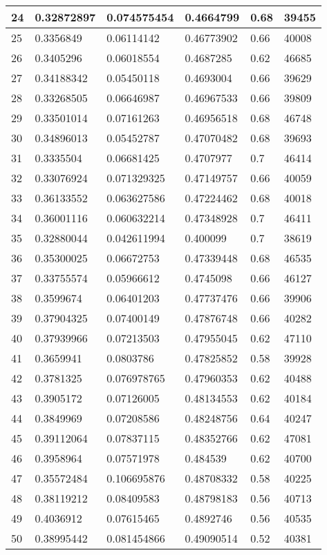 \begin{longtable}{|l|l|l|l|l|l|}
24 & 0.32872897 & 0.074575454 & 0.4664799 & 0.68 & 39455 \\ \hline 
25 & 0.3356849 & 0.06114142 & 0.46773902 & 0.66 & 40008 \\ \hline 
26 & 0.3405296 & 0.06018554 & 0.4687285 & 0.62 & 46685 \\ \hline 
27 & 0.34188342 & 0.05450118 & 0.4693004 & 0.66 & 39629 \\ \hline 
28 & 0.33268505 & 0.06646987 & 0.46967533 & 0.66 & 39809 \\ \hline 
29 & 0.33501014 & 0.07161263 & 0.46956518 & 0.68 & 46748 \\ \hline 
30 & 0.34896013 & 0.05452787 & 0.47070482 & 0.68 & 39693 \\ \hline 
31 & 0.3335504 & 0.06681425 & 0.4707977 & 0.7 & 46414 \\ \hline 
32 & 0.33076924 & 0.071329325 & 0.47149757 & 0.66 & 40059 \\ \hline 
33 & 0.36133552 & 0.063627586 & 0.47224462 & 0.68 & 40018 \\ \hline 
34 & 0.36001116 & 0.060632214 & 0.47348928 & 0.7 & 46411 \\ \hline 
35 & 0.32880044 & 0.042611994 & 0.400099 & 0.7 & 38619 \\ \hline 
36 & 0.35300025 & 0.06672753 & 0.47339448 & 0.68 & 46535 \\ \hline 
37 & 0.33755574 & 0.05966612 & 0.4745098 & 0.66 & 46127 \\ \hline 
38 & 0.3599674 & 0.06401203 & 0.47737476 & 0.66 & 39906 \\ \hline 
39 & 0.37904325 & 0.07400149 & 0.47876748 & 0.66 & 40282 \\ \hline 
40 & 0.37939966 & 0.07213503 & 0.47955045 & 0.62 & 47110 \\ \hline 
41 & 0.3659941 & 0.0803786 & 0.47825852 & 0.58 & 39928 \\ \hline 
42 & 0.3781325 & 0.076978765 & 0.47960353 & 0.62 & 40488 \\ \hline 
43 & 0.3905172 & 0.07126005 & 0.48134553 & 0.62 & 40184 \\ \hline 
44 & 0.3849969 & 0.07208586 & 0.48248756 & 0.64 & 40247 \\ \hline 
45 & 0.39112064 & 0.07837115 & 0.48352766 & 0.62 & 47081 \\ \hline 
46 & 0.3958964 & 0.07571978 & 0.484539 & 0.62 & 40700 \\ \hline 
47 & 0.35572484 & 0.106695876 & 0.48708332 & 0.58 & 40225 \\ \hline 
48 & 0.38119212 & 0.08409583 & 0.48798183 & 0.56 & 40713 \\ \hline 
49 & 0.4036912 & 0.07615465 & 0.4892746 & 0.56 & 40535 \\ \hline 
50 & 0.38995442 & 0.081454866 & 0.49090514 & 0.52 & 40381 \\ \hline 
\end{longtable}